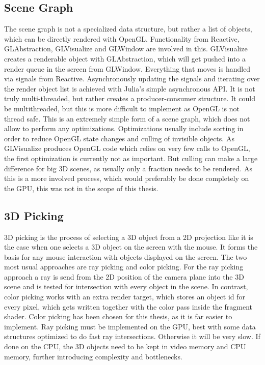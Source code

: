 \subsection{Scene Graph}
The scene graph is not a specialized data structure, but rather a list of objects, which can be directly rendered with OpenGL. Functionality from Reactive, GLAbstraction, GLVisualize and GLWindow are involved in this. GLVisualize creates a renderable object with GLAbstraction, which will get pushed into a render queue in the screen from GLWindow. Everything that moves is handled via signals from Reactive.
Asynchronously updating the signals and iterating over the render object list is achieved with Julia's simple asynchronous API. It is not truly multi-threaded, but rather creates a producer-consumer structure. It could be multithreaded, but this is more difficult to implement as \ac{OpenGL} is not thread safe.
This is an extremely simple form of a scene graph, which does not allow to perform any optimizations.
Optimizations usually include sorting in order to reduce OpenGL state changes and culling of invisible objects.
As GLVisualize produces OpenGL code which relies on very few calls to OpenGL, the first optimization is currently not as important.
But culling can make a large difference for big 3D scenes, as usually only a fraction needs to be rendered.
As this is a more involved process, which would preferably be done completely on the GPU, this was not in the scope of this thesis.

\subsection{3D Picking}

3D picking is the process of selecting a 3D object from a 2D projection like it is the case when one selects a 3D object on the screen with the mouse.
It forms the basis for any mouse interaction with objects displayed on the screen.
The two most usual approaches are ray picking and color picking.
For the ray picking approach a ray is send from the 2D position of the camera plane into the 3D scene and is tested for intersection with every object in the scene. In contrast, color picking works with an extra render target, which stores an object id for every pixel, which gets written together with the color pass inside the fragment shader.
Color picking has been chosen for this thesis, as it is far easier to implement. Ray picking must be implemented on the GPU, best with some data structures optimized to do fast ray intersections. Otherwise it will be very slow. If done on the CPU, the 3D objects need to be kept in video memory and CPU memory, further introducing complexity and bottlenecks.

